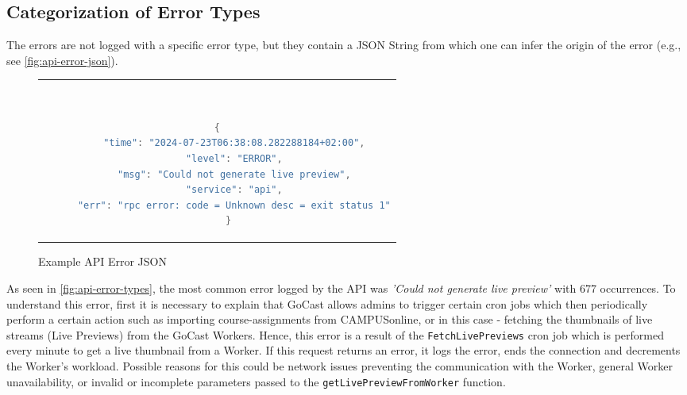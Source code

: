 
\subsection{Categorization of Error Types}

The errors are not logged with a specific error type, but they contain a JSON String from which one can infer the origin of the error (e.g., see \autoref{fig:api-error-json}).

\begin{figure}[htpb]
  \begin{tabular}{c}
  \ \small \begin{lstlisting}[language=Java]
    {
      "time": "2024-07-23T06:38:08.282288184+02:00",
      "level": "ERROR",
      "msg": "Could not generate live preview",
      "service": "api",
      "err": "rpc error: code = Unknown desc = exit status 1"
    }
    \end{lstlisting}
  \end{tabular}
  \caption[Example \ac{API} Error JSON]{Example \ac{API} Error JSON}\label{fig:api-error-json}
\end{figure}

\noindent As seen in \autoref{fig:api-error-types}, the most common error logged by the \ac{API} was \textit{'Could not generate live preview'} with 677 occurrences. To understand this error, first it is necessary to explain that GoCast allows admins to trigger certain cron jobs which then periodically perform a certain action such as importing course-assignments from CAMPUSonline, or in this case - fetching the thumbnails of live streams (Live Previews) from the GoCast Workers. Hence, this error is a result of the \texttt{FetchLivePreviews} cron job which is performed every minute to get a live thumbnail from a Worker. If this request returns an error, it logs the error, ends the connection and decrements the Worker's workload. Possible reasons for this could be network issues preventing the communication with the Worker, general Worker unavailability, or invalid or incomplete parameters passed to the \texttt{getLivePreviewFromWorker} function.

